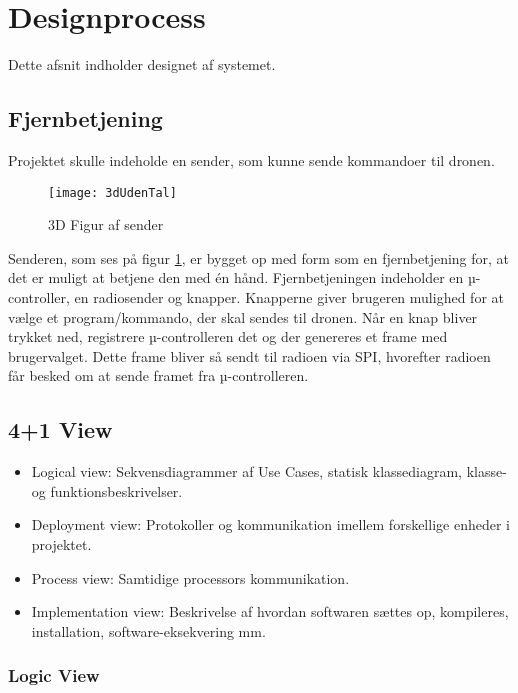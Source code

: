 \documentclass[Main]{subfiles}
\begin{document}
\section{Designprocess}
Dette afsnit indholder designet af systemet.

\subsection{Fjernbetjening}

Projektet skulle indeholde en sender, som kunne sende kommandoer til dronen.

\begin{figure}[H]
\centering
\texttt{[image: 3dUdenTal]}
\caption{3D Figur af sender}
\label{Fig:3dUdenTal}
\end{figure}
\vspace{-20pt}

Senderen, som ses på figur \ref{Fig:3dUdenTal}, er bygget op med form som en fjernbetjening for, at det er muligt at betjene den med én hånd.
Fjernbetjeningen indeholder en µ-controller, en radiosender og knapper.
Knapperne giver brugeren mulighed for at vælge et program/kommando, der skal sendes til dronen. 
Når en knap bliver trykket ned, registrere µ-controlleren det og der genereres et frame med brugervalget. 
Dette frame bliver så sendt til radioen via SPI, hvorefter radioen får besked om at sende framet fra µ-controlleren.


\newpage
\subsection{4+1 View}
\begin{itemize}
\item Logical view: Sekvensdiagrammer af Use Cases, statisk klassediagram, klasse- og funktionsbeskrivelser.
\item Deployment view: Protokoller og kommunikation imellem forskellige enheder i projektet.
\item Process view: Samtidige processors kommunikation.
\item Implementation view: Beskrivelse af hvordan softwaren sættes op, kompileres, installation, software-eksekvering mm.
\end{itemize}

\subsubsection*{Logic View}
\end{document}
